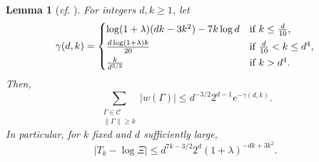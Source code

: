 \documentclass[a4paper]{amsart}
\newtheorem{lem}[thm]{Lemma}
\theoremstyle{definition}
\newcommand{\cC}{\mathcal{C} }
\newcommand{\beq}[1]{\begin{equation}\label{#1}}
\newcommand{\enq}[0]{\end{equation}}
\newcommand{\0}[0]{\emptyset}
\newcommand{\lam}{\lambda}
\begin{document}
\begin{lem}[\textit{cf.} {\cite[Lemma 15]{hypercube}}]\label{lem15}
    For integers $d, k\geq 1$, let
    \[\gamma(d, k) = \begin{cases*}
        \log (1+\lam)(dk-3k^2) - 7k\log d& if $k\leq \frac{d}{10}$, \\
        \frac{d\log(1+\lam)k}{20}& if $\frac{d}{10}<k\leq d^4$,\\
        \frac{k}{d^{3/2}}& if $k>d^4$.
    \end{cases*} \]
    Then,
    \beq{kpbdcube} \sum_{\substack{\Gamma\in\cC \\ \|\Gamma\|\geq k}} |w(\Gamma)| \leq d^{-3/2}2^{d-1}e^{-\gamma(d, k)}. \enq
    In particular, for $k$ fixed and $d$ sufficiently large,
    \beq{kptailscube} |T_k - \log \Xi| \leq d^{7k-3/2}2^d(1+\lam)^{-dk+3k^2}. \enq
\end{lem}
\end{document}
